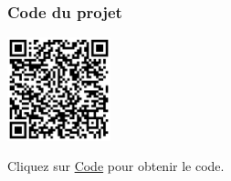 \documentclass[a4paper,12pt]{report}
\begin{document}
\subsubsection{Code du projet}

\begin{minipage}{0.5\textwidth}
    \includegraphics[height=3cm]{Code TC305.png}
\end{minipage}%
\begin{minipage}{0.5\textwidth}
    Cliquez sur \href{https://github.com/DexterTaha/Controllino-PLC-Sample/blob/main/TC300/TC305_Garage_de_stationnement/TC305_Garage_de_stationnement.ino}{Code} pour obtenir le code.
\end{minipage}

\newpage
\end{document}
